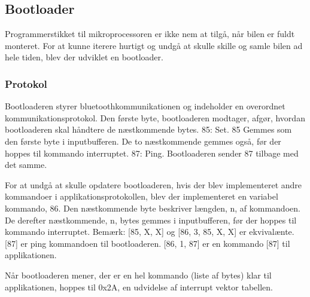 \subsection{Bootloader}
Programmerstikket til mikroprocessoren er ikke nem at tilgå, når bilen er fuldt monteret. For at kunne iterere hurtigt og undgå at skulle skille og samle bilen ad hele tiden, blev der udviklet en bootloader.

\subsubsection{Protokol}
Bootloaderen styrer bluetoothkommunikationen og indeholder en overordnet kommunikationsprotokol.
Den første byte, bootloaderen modtager, afgør, hvordan bootloaderen skal håndtere de næstkommende bytes.
85: Set. 85 Gemmes som den første byte i inputbufferen. De to næstkommende gemmes også, før der hoppes til kommando interruptet.
87: Ping. Bootloaderen sender 87 tilbage med det samme.

For at undgå at skulle opdatere bootloaderen, hvis der blev implementeret andre kommandoer i applikationsprotokollen, blev der implementeret en variabel kommando, 86.
Den næstkommende byte beskriver længden, n, af kommandoen. De derefter næstkommende, n, bytes gemmes i inputbufferen, før der hoppes til kommando interruptet.
Bemærk:
[85, X, X] og [86, 3, 85, X, X] er ekvivalænte.
[87] er ping kommandoen til bootloaderen. [86, 1, 87] er en kommando [87] til applikationen.

Når bootloaderen mener, der er en hel kommando (liste af bytes) klar til applikationen, hoppes til 0x2A, en udvidelse af interrupt vektor tabellen.
